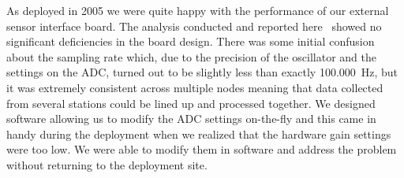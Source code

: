 As deployed in 2005 we were quite happy with the performance of our external
sensor interface board. The analysis conducted and reported
here~\cite{volcano-osdi06} showed no significant deficiencies in the board
design.  There was some initial confusion about the sampling rate which, due
to the precision of the oscillator and the settings on the ADC, turned out to
be slightly less than exactly 100.000~Hz, but it was extremely consistent
across multiple nodes meaning that data collected from several stations could
be lined up and processed together.  We designed software allowing us to
modify the ADC settings on-the-fly and this came in handy during the
deployment when we realized that the hardware gain settings were too low. We
were able to modify them in software and address the problem without
returning to the deployment site.

